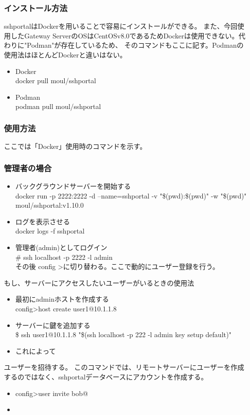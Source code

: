 \documentclass[12pt,a4paper,titlepage]{jsarticle}
\begin{document}
\subsubsection*{インストール方法}
sshportalはDockerを用いることで容易にインストールができる。
また、今回使用したGateway ServerのOSはCentOSv8.0であるためDockerは使用できない。代わりに"Podman"が存在しているため、
そのコマンドもここに記す。Podmanの使用法はほとんどDockerと違いはない。

\begin{itemize}
    \item Docker\mbox{}\\docker pull moul/sshportal
    \item Podman\mbox{}\\podman pull moul/sshportal
\end{itemize}

\subsubsection*{使用方法}
ここでは「Docker」使用時のコマンドを示す。
\subsubsection*{管理者の場合}
\begin{itemize}

    \item バックグラウンドサーバーを開始する \mbox{}\\docker run -p 2222:2222 -d --name=sshportal -v "\$(pwd):\$(pwd)" -w "\$(pwd)" 
    moul/sshportal:v1.10.0
    \item ログを表示させる\mbox{}\\docker logs -f sshportal
    \item 管理者(admin)としてログイン\mbox{}\\ \# ssh localhost -p 2222 -l admin\\その後 config \textgreater に切り替わる。ここで動的にユーザー登録を行う。
    
\end{itemize}
もし、サーバーにアクセスしたいユーザーがいるときの使用法
\begin{itemize}
    \item 最初にadminホストを作成する\mbox{}\\ config\textgreater  host create user1@10.1.1.8
    \item サーバーに鍵を追加する\mbox{} \\ \$ ssh user1@10.1.1.8 "\$(ssh localhost -p 222 -l admin key setup default)"
    \item これによって
\end{itemize}
ユーザーを招待する。
このコマンドでは、リモートサーバーにユーザーを作成するのではなく、sshportalデータベースにアカウントを作成する。
\begin{itemize}
    \item config\textgreater user invite bob@
    \item 
\end{itemize}
\end{document}
